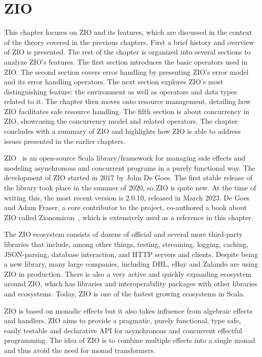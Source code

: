 \chapter{ZIO} \label{zio}
This chapter focuses on ZIO and its features, which are discussed in the context of the theory covered in the previous chapters. First a brief history and overview of ZIO is presented. The rest of the chapter is organized into several sections to analyze ZIO's features. The first section introduces the basic operators used in ZIO. The second section covers error handling by presenting ZIO's error model and its error handling operators. The next section explores ZIO's most distinguishing feature: the environment as well as operators and data types related to it. The chapter then moves onto resource management, detailing how ZIO facilitates safe resource handling. The fifth section is about concurrency in ZIO, showcasing the concurrency model and related operators. The chapter concludes with a summary of ZIO and highlights how ZIO is able to address issues presented in the earlier chapters.

ZIO~\cite{zio} is an open-source Scala library/framework for managing side effects and modeling asynchronous and concurrent programs in a purely functional way. The development of ZIO started in 2017 by John De Goes. The first stable release of the library took place in the summer of 2020, so ZIO is quite new. At the time of writing this, the most recent version is 2.0.10, released in March 2023. De Goes and Adam Fraser, a core contributor to the project, co-authored a book about ZIO called Zionomicon~\cite{zionomicon}, which is extensively used as a reference in this chapter.

The ZIO ecosystem consists of dozens of official and several more third-party libraries that include, among other things, testing, streaming, logging, caching, JSON-parsing, database interaction, and HTTP servers and clients. Despite being a new library, many large companies, including DHL, eBay and Zalando are using ZIO in production. There is also a very active and quickly expanding ecosystem around ZIO, which has libraries and interoperability packages with other libraries and ecosystems. Today, ZIO is one of the fastest growing ecosystems in Scala.

ZIO is based on monadic effects but it also takes influence from algebraic effects and handlers. ZIO aims to provide a pragmatic, purely functional, type safe, easily testable and declarative API for asynchronous and concurrent effectful programming. The idea of ZIO is to combine multiple effects into a single monad and thus avoid the need for monad transformers.

